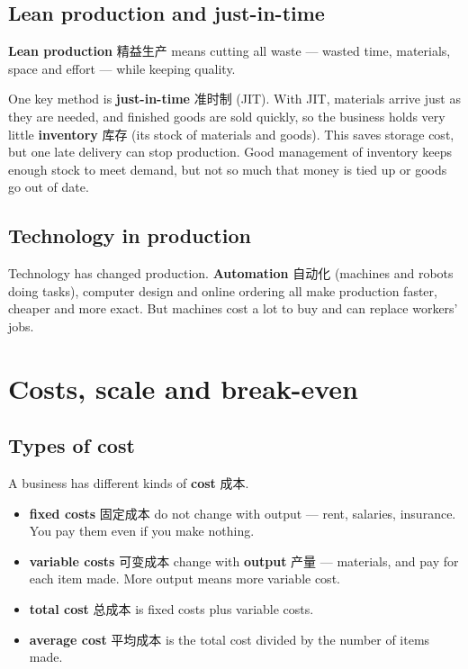 \documentclass[11pt]{article}
\begin{document}
\subsection*{Lean production and just-in-time}

\textbf{Lean production} 精益生产 means cutting all waste — wasted time, materials, space and effort — while keeping quality.

One key method is \textbf{just-in-time} 准时制 (JIT). With JIT, materials arrive just as they are needed, and finished goods are sold quickly, so the business holds very little \textbf{inventory} 库存 (its stock of materials and goods). This saves storage cost, but one late delivery can stop production. Good management of inventory keeps enough stock to meet demand, but not so much that money is tied up or goods go out of date.

\subsection*{Technology in production}

Technology has changed production. \textbf{Automation} 自动化 (machines and robots doing tasks), computer design and online ordering all make production faster, cheaper and more exact. But machines cost a lot to buy and can replace workers' jobs.

\section*{Costs, scale and break-even}

\subsection*{Types of cost}

A business has different kinds of \textbf{cost} 成本.

\begin{itemize}
\item \textbf{fixed costs} 固定成本 do not change with output — rent, salaries, insurance. You pay them even if you make nothing.

\item \textbf{variable costs} 可变成本 change with \textbf{output} 产量 — materials, and pay for each item made. More output means more variable cost.

\item \textbf{total cost} 总成本 is fixed costs plus variable costs.

\item \textbf{average cost} 平均成本 is the total cost divided by the number of items made.

\end{itemize}
\end{document}
